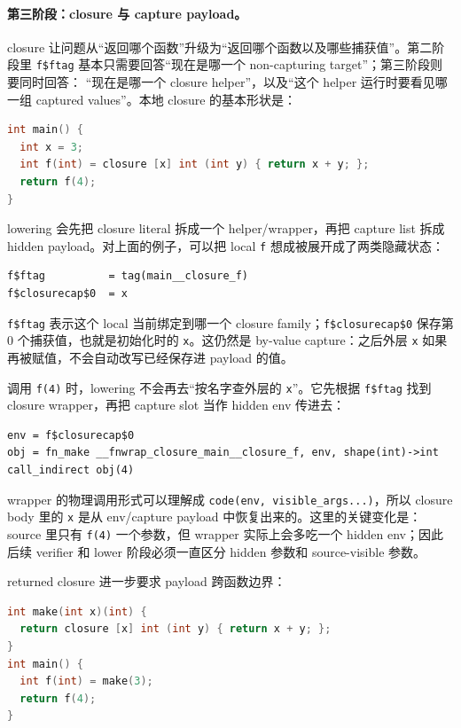\documentclass[UTF8,a4paper,11pt]{ctexart}
\begin{document}
\paragraph{第三阶段：closure 与 capture payload。}
closure 让问题从“返回哪个函数”升级为“返回哪个函数以及哪些捕获值”。第二阶段里
\texttt{f\$ftag} 基本只需要回答“现在是哪一个 non-capturing target”；第三阶段则要同时回答：
“现在是哪一个 closure helper”，以及“这个 helper 运行时要看见哪一组 captured values”。本地
closure 的基本形状是：

\begin{lstlisting}[language=C]
int main() {
  int x = 3;
  int f(int) = closure [x] int (int y) { return x + y; };
  return f(4);
}
\end{lstlisting}

lowering 会先把 closure literal 拆成一个 helper/wrapper，再把 capture list 拆成 hidden
payload。对上面的例子，可以把 local \texttt{f} 想成被展开成了两类隐藏状态：

\begin{lstlisting}[language={}]
f$ftag          = tag(main__closure_f)
f$closurecap$0  = x
\end{lstlisting}

\texttt{f\$ftag} 表示这个 local 当前绑定到哪一个 closure family；\texttt{f\$closurecap\$0}
保存第 0 个捕获值，也就是初始化时的 \texttt{x}。这仍然是 by-value capture：之后外层
\texttt{x} 如果再被赋值，不会自动改写已经保存进 payload 的值。

调用 \texttt{f(4)} 时，lowering 不会再去“按名字查外层的 \texttt{x}”。它先根据
\texttt{f\$ftag} 找到 closure wrapper，再把 capture slot 当作 hidden env 传进去：

\begin{lstlisting}[language={}]
env = f$closurecap$0
obj = fn_make __fnwrap_closure_main__closure_f, env, shape(int)->int
call_indirect obj(4)
\end{lstlisting}

wrapper 的物理调用形式可以理解成 \texttt{code(env, visible\_args...)}，所以 closure body 里的
\texttt{x} 是从 env/capture payload 中恢复出来的。这里的关键变化是：source 里只有
\texttt{f(4)} 一个参数，但 wrapper 实际上会多吃一个 hidden env；因此后续 verifier 和 lower
阶段必须一直区分 hidden 参数和 source-visible 参数。

returned closure 进一步要求 payload 跨函数边界：

\begin{lstlisting}[language=C]
int make(int x)(int) {
  return closure [x] int (int y) { return x + y; };
}
int main() {
  int f(int) = make(3);
  return f(4);
}
\end{lstlisting}
\end{document}
